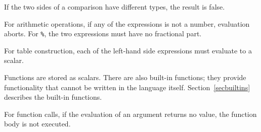 If the two sides of a comparison have different types, the result is false.

For arithmetic operations, if any of the expressions is not a number,
evaluation aborts. For {\tt \%}, the two expressions must have no fractional
part.

For table construction, each of the left-hand side expressions must evaluate to
a scalar.

Functions are stored as scalars. There are also built-in functions; they
provide functionality that cannot be written in the language itself.
Section~\ref{secbuiltins} describes the built-in functions.

For function calls, if the evaluation of an argument returns no value, the
function body is not executed.
